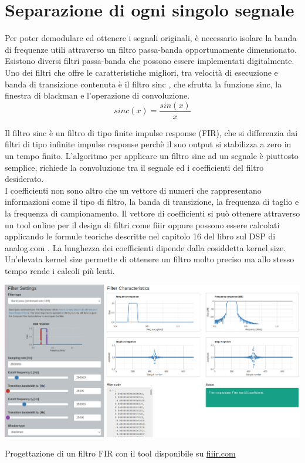 \documentclass{article}
\begin{document}
\section{Separazione di ogni singolo segnale}
Per poter demodulare ed ottenere i segnali originali, è necessario isolare la banda di frequenze utili attraverso un filtro
passa-banda opportunamente dimensionato.\\
Esistono diversi filtri passa-banda che possono essere implementati digitalmente. Uno dei filtri che offre le caratteristiche
migliori, tra velocità di esecuzione e banda di transizione contenuta è il filtro sinc \cite{sinc}, che sfrutta la funzione
sinc, la finestra di blackman e l'operazione di convoluzione.\\

\begin{equation}
    sinc(x) = \frac{sin(x)}{x}
\end{equation}

Il filtro sinc è un filtro di tipo finite impulse response (FIR), che si differenzia dai filtri di tipo infinite impulse response
perchè il suo output si stabilizza a zero in un tempo finito. L'algoritmo per applicare un filtro sinc ad un segnale è
piuttosto semplice, richiede la convoluzione \cite{convolution} tra il segnale ed i coefficienti del filtro desiderato.\\
I coefficienti non sono altro che un vettore di numeri che rappresentano informazioni come il tipo di filtro, la banda di
transizione, la frequenza di taglio e la frequenza di campionamento. Il vettore di coefficienti si può ottenere attraverso un
tool online per il design di filtri come fiiir \cite{fiiir} oppure possono essere calcolati applicando le formule teoriche descritte
nel capitolo 16 del libro sul DSP di analog.com \cite{dsp-book-ch16}. La lunghezza dei coefficienti dipende dalla cosiddetta kernel
size. Un'elevata kernel size permette di ottenere un filtro molto preciso ma allo stesso tempo rende i calcoli più lenti.\\

\begin{center}
    \includegraphics[width=\textwidth]{fiiir.png}
\end{center}
Progettazione di un filtro FIR con il tool disponibile su \href{https://fiiir.com}{fiiir.com}\\
\end{document}
